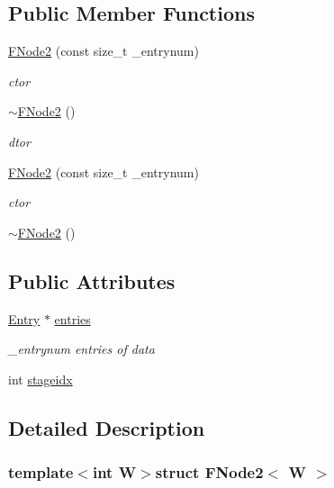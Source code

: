 \subsection*{Public Member Functions}
\begin{DoxyCompactItemize}
\item 
\hyperlink{structFNode2_a2caf47c8bacc9d9488f3aefee3863a5e}{F\-Node2} (const size\-\_\-t \-\_\-entrynum)
\begin{DoxyCompactList}\small\item\em ctor \end{DoxyCompactList}\item 
\hyperlink{structFNode2_afeb99d5511eff340aa0640bc561efff5}{$\sim$\-F\-Node2} ()
\begin{DoxyCompactList}\small\item\em dtor \end{DoxyCompactList}\item 
\hyperlink{structFNode2_a2caf47c8bacc9d9488f3aefee3863a5e}{F\-Node2} (const size\-\_\-t \-\_\-entrynum)
\begin{DoxyCompactList}\small\item\em ctor \end{DoxyCompactList}\item 
\hyperlink{structFNode2_afeb99d5511eff340aa0640bc561efff5}{$\sim$\-F\-Node2} ()
\end{DoxyCompactItemize}
\subsection*{Public Attributes}
\begin{DoxyCompactItemize}
\item 
\hyperlink{structFNode2_1_1Entry}{Entry} $\ast$ \hyperlink{structFNode2_a4c9f83cc7270896ae0ed821948579724}{entries}
\begin{DoxyCompactList}\small\item\em \-\_\-entrynum entries of data \end{DoxyCompactList}\item 
int \hyperlink{structFNode2_a2ade0b01b4f3f1c15ae89599d4063d2c}{stageidx}
\end{DoxyCompactItemize}


\subsection{Detailed Description}
\subsubsection*{template$<$int W$>$struct F\-Node2$<$ W $>$}

